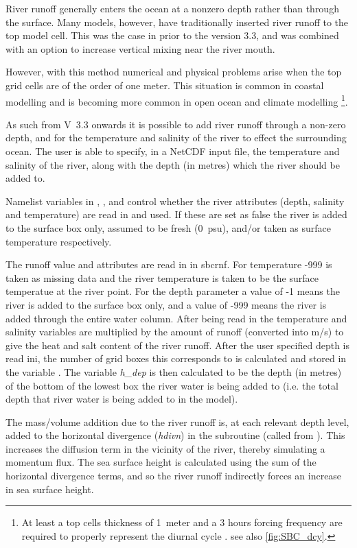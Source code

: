 \documentclass[../tex_main/NEMO_manual]{subfiles}
\begin{document}
River runoff generally enters the ocean at a nonzero depth rather than through the surface.
Many models, however, have traditionally inserted river runoff to the top model cell.
This was the case in \NEMO prior to the version 3.3,
and was combined with an option to increase vertical mixing near the river mouth.

However, with this method numerical and physical problems arise when the top grid cells are of the order of one meter.
This situation is common in coastal modelling and is becoming more common in open ocean and climate modelling 
\footnote{
  At least a top cells thickness of 1~meter and a 3 hours forcing frequency are required to
  properly represent the diurnal cycle \citep{Bernie_al_JC05}.
  see also \autoref{fig:SBC_dcy}.}.

As such from V~3.3 onwards it is possible to add river runoff through a non-zero depth,
and for the temperature and salinity of the river to effect the surrounding ocean.
The user is able to specify, in a NetCDF input file, the temperature and salinity of the river,
along with the depth (in metres) which the river should be added to.

Namelist variables in , ,  and
 control whether the river attributes (depth, salinity and temperature) are read in and used.
If these are set as false the river is added to the surface box only, assumed to be fresh (0~psu),
and/or taken as surface temperature respectively.

The runoff value and attributes are read in in sbcrnf.  
For temperature -999 is taken as missing data and the river temperature is taken to
be the surface temperatue at the river point.
For the depth parameter a value of -1 means the river is added to the surface box only, 
and a value of -999 means the river is added through the entire water column. 
After being read in the temperature and salinity variables are multiplied by the amount of runoff
(converted into m/s) to give the heat and salt content of the river runoff.
After the user specified depth is read ini,
the number of grid boxes this corresponds to is calculated and stored in the variable .
The variable \textit{h\_dep} is then calculated to be the depth (in metres) of
the bottom of the lowest box the river water is being added to
(i.e. the total depth that river water is being added to in the model).

The mass/volume addition due to the river runoff is, at each relevant depth level, added to
the horizontal divergence (\textit{hdivn}) in the subroutine  (called from ).
This increases the diffusion term in the vicinity of the river, thereby simulating a momentum flux.
The sea surface height is calculated using the sum of the horizontal divergence terms,
and so the river runoff indirectly forces an increase in sea surface height. 
\end{document}
